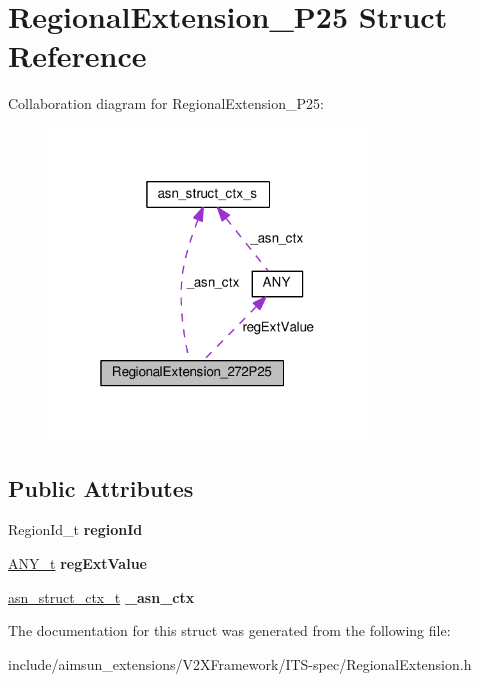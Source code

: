 \hypertarget{structRegionalExtension__272P25}{}\section{Regional\+Extension\+\_\+P25 Struct Reference}
\label{structRegionalExtension__272P25}


Collaboration diagram for Regional\+Extension\+\_\+P25\+:\nopagebreak
\begin{figure}[H]
\begin{center}
\leavevmode
\includegraphics[width=241pt]{structRegionalExtension__272P25__coll__graph}
\end{center}
\end{figure}
\subsection*{Public Attributes}
\begin{DoxyCompactItemize}
\item 
Region\+Id\+\_\+t {\bfseries region\+Id}\hypertarget{structRegionalExtension__272P25_a91e585d3671ca2ca575dbdb76d0634c1}{}\label{structRegionalExtension__272P25_a91e585d3671ca2ca575dbdb76d0634c1}

\item 
\hyperlink{structANY}{A\+N\+Y\+\_\+t} {\bfseries reg\+Ext\+Value}\hypertarget{structRegionalExtension__272P25_a6310ab679978c8e2bab2e687eb2de532}{}\label{structRegionalExtension__272P25_a6310ab679978c8e2bab2e687eb2de532}

\item 
\hyperlink{structasn__struct__ctx__s}{asn\+\_\+struct\+\_\+ctx\+\_\+t} {\bfseries \+\_\+asn\+\_\+ctx}\hypertarget{structRegionalExtension__272P25_a588d8da74152a92bc02839b1fdaf81d1}{}\label{structRegionalExtension__272P25_a588d8da74152a92bc02839b1fdaf81d1}

\end{DoxyCompactItemize}


The documentation for this struct was generated from the following file\+:\begin{DoxyCompactItemize}
\item 
include/aimsun\+\_\+extensions/\+V2\+X\+Framework/\+I\+T\+S-\/spec/Regional\+Extension.\+h\end{DoxyCompactItemize}

